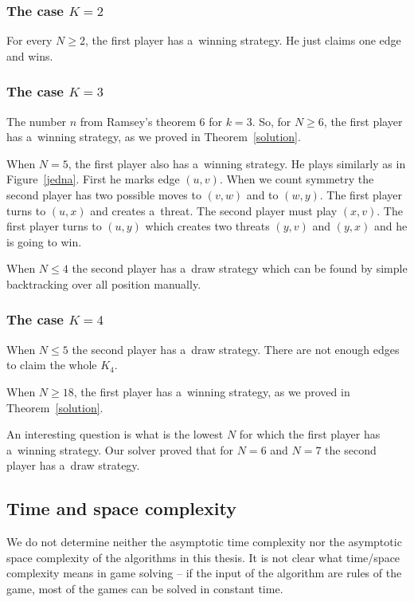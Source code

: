 \subsubsection{The case $K=2$}

For every $N \ge 2$, the first player has a~winning strategy. He just claims one edge
and wins.

\subsubsection{The case $K=3$}

The number $n$ from Ramsey's theorem 6 for $k=3$. So, for $N \ge
6$, the first player has a~winning strategy, as we proved in
Theorem~\ref{solution}. 

When $N=5$, the first player also has a~winning strategy. He plays similarly as in
Figure~\ref{jedna}. First he marks edge $(u,v)$. When we count symmetry the second player has
two possible moves to $(v,w)$ and to $(w,y)$. The first player turns to $(u,x)$ and
creates a~threat. The second player must play $(x,v)$. The first player turns to
$(u,y)$ which creates two threats $(y,v)$ and $(y,x)$ and he is going to win. 

When $N \le 4$ the second player has a~draw strategy which can be found by simple
backtracking over all position manually. 

\subsubsection{The case $K=4$}

When $N \le 5$ the second player has a~draw strategy. There are not enough edges to
claim the whole $K_4$.

When $N \ge 18$, the first player has a~winning strategy, as we proved in
Theorem~\ref{solution}.

An interesting question is what is the lowest $N$ for which the first player has
a~winning strategy. Our solver proved that for $N=6$ and $N=7$ the second
player has a~draw strategy.

\subsection{Time and space complexity}

We do not determine neither the asymptotic time complexity nor the asymptotic space complexity 
of the algorithms in this thesis.
It is not clear what time/space complexity means in game solving -- 
if the input of the  algorithm are rules of the game, most of the games can be solved in constant time.

